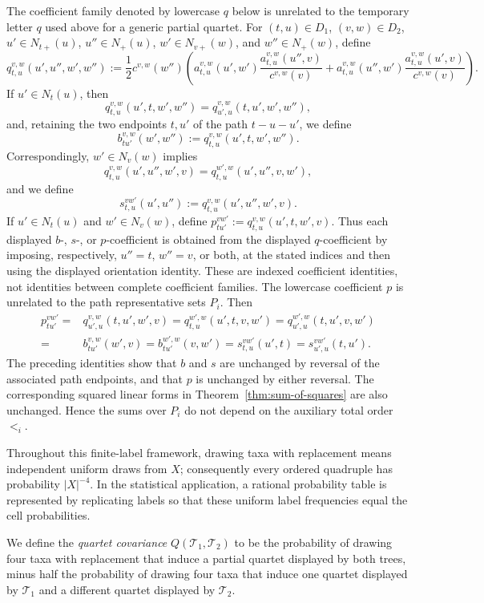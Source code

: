 \documentclass[pdflatex,sn-mathphys-num]{sn-jnl}
\theoremstyle{thmstyleone}
\begin{document}
The coefficient family denoted by lowercase $q$ below is unrelated to the
temporary letter $q$ used above for a generic partial quartet.  For
$(t,u)\in D_1$, $(v,w)\in D_2$, $u'\in N_{t+}(u)$,
$u''\in N_+(u)$, $w'\in N_{v+}(w)$, and $w''\in N_+(w)$, define
\begingroup\small
\[
q_{t,u}^{v,w}(u',u'',w',w'')
:=\frac12c^{v,w}(w'')\left(
 a_{t,u}^{v,w}(u',w')\frac{a_{t,u}^{v,w}(u'',v)}{c^{v,w}(v)}
+
 a_{t,u}^{v,w}(u'',w')\frac{a_{t,u}^{v,w}(u',v)}{c^{v,w}(v)}
\right).
\]
\endgroup
If $u'\in N_t(u)$, then
\[
q_{t,u}^{v,w}(u',t,w',w'')
=q_{u',u}^{v,w}(t,u',w',w''),
\]
and, retaining the two endpoints $t,u'$ of the path $t-u-u'$, we define
\[
b_{tu'}^{v,w}(w',w''):=q_{t,u}^{v,w}(u',t,w',w'').
\]
Correspondingly, $w'\in N_v(w)$ implies
\[
q_{t,u}^{v,w}(u',u'',w',v)
=q_{t,u}^{w',w}(u',u'',v,w'),
\]
and we define
\[
s_{t,u}^{vw'}(u',u''):=q_{t,u}^{v,w}(u',u'',w',v).
\]
If $u'\in N_t(u)$ and $w'\in N_v(w)$, define
$p_{tu'}^{vw'}:=q_{t,u}^{v,w}(u',t,w',v)$.
Thus each displayed $b$-, $s$-, or $p$-coefficient is obtained from the
displayed $q$-coefficient by imposing, respectively, $u''=t$, $w''=v$, or
both, at the stated indices and then using the displayed orientation
identity.  These are indexed coefficient identities, not identities between
complete coefficient families.  The lowercase coefficient $p$ is unrelated
to the path representative sets $P_i$.
Then
\begin{align*}
p_{tu'}^{vw'}
={}&q_{u',u}^{v,w}(t,u',w',v)
=q_{t,u}^{w',w}(u',t,v,w')
=q_{u',u}^{w',w}(t,u',v,w')\\
={}&b_{tu'}^{v,w}(w',v)
=b_{tu'}^{w',w}(v,w')
=s_{t,u}^{vw'}(u',t)
=s_{u',u}^{vw'}(t,u').
\end{align*}
The preceding identities show that $b$ and $s$ are unchanged by reversal of
the associated path endpoints, and that $p$ is unchanged by either reversal.
The corresponding squared linear forms in
Theorem~\ref{thm:sum-of-squares} are also unchanged.  Hence the sums over
$P_i$ do not depend on the auxiliary total order $<_i$.

Throughout this finite-label framework, drawing taxa with replacement means
independent uniform draws from $X$; consequently every ordered quadruple has
probability $|X|^{-4}$.  In the statistical application, a rational
probability table is represented by replicating labels so that these uniform
label frequencies equal the cell probabilities.

We define the \emph{quartet covariance} $Q(\mathcal T_1,\mathcal T_2)$
to be the probability of drawing four taxa with replacement that induce
a partial quartet displayed by both trees, minus half the probability
of drawing four taxa that induce one quartet displayed by $\mathcal T_1$
and a different quartet displayed by $\mathcal T_2$.
\end{document}
